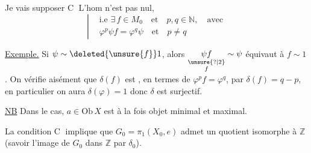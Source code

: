 
Je vais supposer
\textcircled{C} L'hom  n'est pas nul,
\[
\left|\begin{aligned}&\text{i.e }\exists\,f\in M_0\quad\text{et}\quad p,q\in\mathbb N,\quad\text{avec}\\ &\varphi^p\psi f=\varphi^q\psi\quad\text{et}\quad p\ne q\end{aligned}\right.
\]

\uline{Exemple.} Si $\psi\sim\deleted{\unsure{f}}1$, alors  $\underset{\substack{\unsure{?|2}\\ f}}{\psi f}\sim\psi$  équivaut à $f\sim1$ .  On vérifie aisément que $\delta(f)$ est ,  en termes de $\varphi^p f=\varphi^q$, par $\delta(f)=q-p$,  en particulier  on aura $\delta(\varphi)=1$ donc $\delta$ est surjectif. 

\uline{NB} Dans le cas, $a\in\mathrm{Ob}\,X$ est à la fois objet minimal et maximal.

La condition \textcircled{C} implique que $G_0=\pi_1(X_0,e)$ admet un quotient isomorphe à $\mathbb Z$ (savoir l'image de $G_0$ dans $\mathbb Z$ par $\delta_0$).

